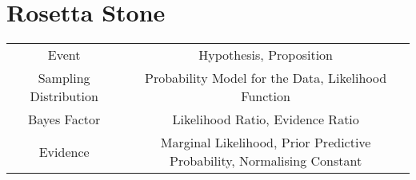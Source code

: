 \chapter{Rosetta Stone}

\begin{table}
\begin{center}
\begin{tabular}{cc}
Event & Hypothesis, Proposition \\
Sampling Distribution & Probability Model for the Data, Likelihood Function \\
Bayes Factor & Likelihood Ratio, Evidence Ratio \\
Evidence & Marginal Likelihood, Prior Predictive Probability, Normalising
Constant
\end{tabular}
\end{center}
\end{table}

